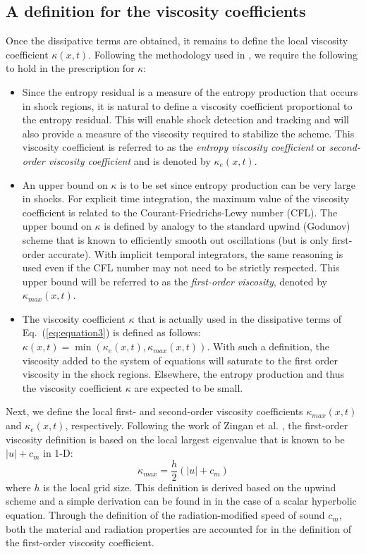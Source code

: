 \documentclass[review]{elsarticle}
\newcommand{\eqt}[1]{Eq.~(\ref{#1})}                     %
\begin{document}
\subsection{A definition for the viscosity coefficients}
Once the dissipative terms are obtained, it remains to define the local viscosity coefficient $\kappa(x,t)$. Following the methodology used in \cite{jlg1, jlg2}, we require the following to hold in the prescription for $\kappa$:
\begin{itemize}
\item Since the entropy residual is a measure of the entropy production that occurs in shock regions, it is natural to define a viscosity coefficient proportional to the entropy residual. This will enable shock detection and tracking and will also provide a measure of the viscosity required to stabilize the scheme. This viscosity coefficient is referred to as the \emph{entropy viscosity coefficient} or \emph{second-order viscosity coefficient} and is denoted by $\kappa_e(x,t)$.
\item An upper bound on $\kappa$ is to be set since entropy production can be very large in shocks. For explicit time integration, the maximum value of the viscosity coefficient is related to the Courant-Friedrichs-Lewy number (CFL). The upper bound on  $\kappa$  is defined by analogy to the standard upwind (Godunov) scheme that is known to efficiently smooth out oscillations (but is only first-order accurate). With implicit temporal integrators, the same reasoning is used even if the CFL number may not need to be strictly respected. This upper bound will be referred to as the \emph{first-order viscosity}, denoted by $\kappa_{max}(x,t)$.  
\item The viscosity coefficient $\kappa$ that is actually used in the dissipative terms of \eqt{eq:equation3} is defined as follows: $\kappa(x,t) = \min ( \kappa_e(x,t), \kappa_{max}(x,t) )$. With such a definition, the viscosity added to the system of equations will saturate to the first order viscosity in the shock regions. Elsewhere, the entropy production and thus the viscosity coefficient $\kappa$ are expected to be small.
\end{itemize}

Next, we define the local first- and second-order viscosity coefficients $\kappa_{max}(x,t)$ and $\kappa_e(x,t)$, respectively. Following the work of Zingan et al. \cite{valentin}, the first-order viscosity definition is based on the local largest eigenvalue that is known to be $|u| + c_m$ in 1-D:
\begin{equation}
\label{eq:equation8}
\kappa_{max} = \frac{h}{2} \left( |u| + c_m \right)
\end{equation}  
where $h$ is the local grid size. This definition is derived based on the upwind scheme and a simple derivation can be found in \cite{jlg1} in the case of a scalar hyperbolic equation. Through the definition of the radiation-modified speed of sound $c_m$, both the material and radiation properties are accounted for in the definition of the first-order viscosity coefficient.
\end{document}
